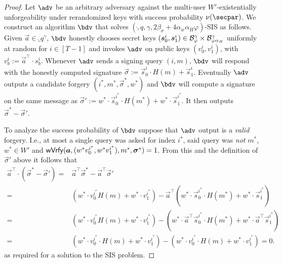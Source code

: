 \begin{proof}
  Let $\adv$ be an arbitrary adversary against the multi-user $W'$-existentially unforgeability under rerandomized keys with success probability $\nu(\secpar)$.
  We construct an algorithm $\bdv$ that solves $(\ring,q,\gamma,2\beta_\sigma + 4\alpha_w\alpha_H\varphi)$-SIS as follows.
  Given $\vec{a}\in\ring_q^\gamma$, $\bdv$ honestly chooses secret keys $(\boldsymbol{s}^i_0,\boldsymbol{s}^i_1) \in \mathcal{B}_{\varphi}^\gamma\times \mathcal{B}_{\varphi\alpha_H}^\gamma$ uniformly at random for $i\in[T-1]$ and invokes $\adv$ on public keys $(v^i_0,v^i_1)$, with $v^i_b := \vec{a}^\intercal\cdot s^i_b$.
  Whenever $\adv$ sends a signing query $(i,m)$, $\bdv$ will respond with the honestly computed signature $\vec{\sigma}:=\vec{s}^i_0\cdot H(m)+ \vec{s}^i_1$.
  Eventually $\adv$ outputs a candidate forgery $(i^*,m^*,\vec{\sigma}^*,w^*)$ and $\bdv$ will compute a signature on the same message as $\vec{\sigma}' := w^*\cdot\vec{s}^{i^*}_0\cdot H(m^*)+ w^*\cdot\vec{s}^{i^*}_1$.
  It then outputs $\vec{\sigma}^*-\vec{\sigma}'$.
  
  To analyze the success probability of $\bdv$ suppose that $\adv$ output is a \emph{valid} forgery.
  I.e., at most a single query was asked for index $i^*$, said query was \emph{not} $m^*$, $w^*\in W'$ and $\mathsf{wVrfy}(\boldsymbol{a},(w^*v^{i^*}_0,w^*v^{i^*}_1),m^*,\allowbreak\boldsymbol{\sigma}^*)=1$.
  From this and the definition of $\vec{\sigma}'$ above it follows that
  \begin{align*}
       \vec{a}^\intercal\cdot(\vec{\sigma}^*-\vec{\sigma}') ={}& \vec{a}^\intercal\vec{\sigma}^*-\vec{a}^\intercal\vec{\sigma}'\\ 
    ={}& (w^*\cdot v^{i^*}_0 H(m) + w^*\cdot v^{i^*}_1) - \vec{a}^\intercal(w^*\cdot \vec{s}^{i^*}_0\cdot H(m^*)+ w^*\cdot\vec{s}^{i^*}_1)\\
    ={}& (w^*\cdot v^{i^*}_0 H(m) + w^*\cdot v^{i^*}_1) - (w^*\cdot\vec{a}^\intercal\vec{s}^{i^*}_0\cdot H(m^*)+ w^*\cdot\vec{a}^\intercal\vec{s}^{i^*}_1)\\
    ={}& (w^*\cdot v^{i^*}_0\cdot H(m) + w^*\cdot v^{i^*}_1) - (w^*\cdot v^{i^*}_0\cdot H(m) + w^*\cdot v^{i^*}_1) = 0.
  \end{align*}
  as required for a solution to the SIS problem.
  

\end{proof}
